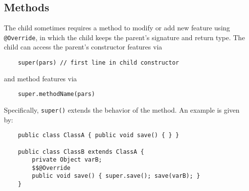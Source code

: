 \documentclass[letterpaper, openany, justified]{tufte-book}
\newcommand{\cd}[1]{\lstinline{#1}}
\begin{document}
\begin{fullwidth}
\section{Methods}
The child sometimes requires a method to modify or add new feature using \cd{@Override}, in which the child keeps the parent's signature and return type. The child can access the parent's constructor features via
\begin{lstlisting}
    super(pars) // first line in child constructor
\end{lstlisting}
and method features via
\begin{lstlisting}
    super.methodName(pars)
\end{lstlisting}
Specifically, \cd{super()} extends the behavior of the method. An example is given by:
\begin{lstlisting}
    public class ClassA { public void save() { } }

    public class ClassB extends ClassA {
        private Object varB;
        $$@Override
        public void save() { super.save(); save(varB); }
    }
\end{lstlisting}

\end{fullwidth}
\end{document}
